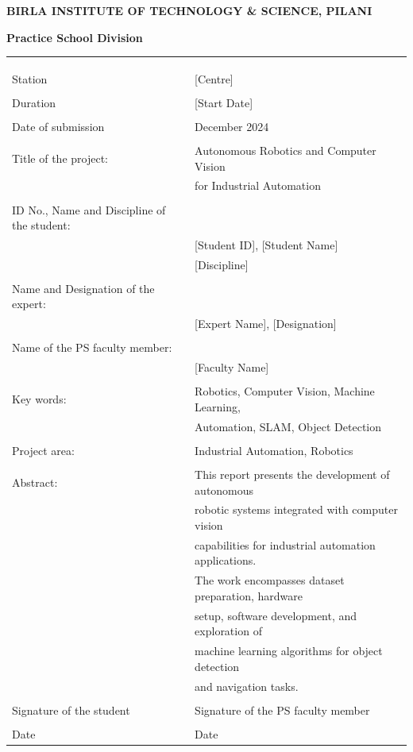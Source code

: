 \documentclass{book}
\begin{document}
\thispagestyle{empty}

	\centerline{\bf BIRLA INSTITUTE OF TECHNOLOGY \& SCIENCE, PILANI}
	\vspace*{0.2cm}
	\centerline{\bf Practice School Division}
	\vspace*{0.3cm}
	{\bf 
		\begin{tabular}{p{6cm}l}
			& \\
			& \\
			& \\
			Station & \hspace*{3cm} [Centre] \\
			& \\
			Duration &\hspace*{3cm} [Start Date] \\
			& \\
			Date of submission & December 2024 \\
			& \\
			Title of the project: & Autonomous Robotics and Computer Vision \\
			& for Industrial Automation \\
			& \\
			ID No., Name and Discipline of the student: & \\
			& [Student ID], [Student Name] \\
			& [Discipline] \\
			& \\
			Name and Designation of the expert: & \\
			& [Expert Name], [Designation] \\
			& \\
			Name of the PS faculty member: & \\
			& [Faculty Name] \\
			& \\
			Key words: & Robotics, Computer Vision, Machine Learning, \\
			& Automation, SLAM, Object Detection \\
			& \\
			Project area:  & Industrial Automation, Robotics \\
			& \\
			Abstract: & This report presents the development of autonomous \\
			& robotic systems integrated with computer vision \\
			& capabilities for industrial automation applications. \\
			& The work encompasses dataset preparation, hardware \\
			& setup, software development, and exploration of \\
			& machine learning algorithms for object detection \\
			& and navigation tasks. \\
			& \\
			Signature of the student & \hspace*{1cm}Signature of the PS faculty member \\
			& \\
			Date & \hspace*{1cm}Date \\
		\end{tabular}}
\end{document}
